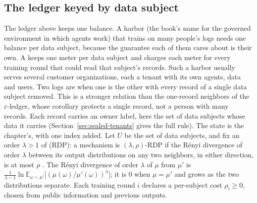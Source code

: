 \subsection{The ledger keyed by data subject}\label{sec:sealed-person-ledger}

\noindent The ledger above keeps one balance. A harbor (the book's name for
the governed environment in which agents work) that trains on many people's
logs needs one balance per data subject, because the guarantee each of them
cares about is their own. A  keeps one meter per
data subject and charges each meter for every training round that could read
that subject's records. Such a harbor usually serves several customer organizations, each a
tenant with its own agents, data and users. Two logs are
 when one is the other with every record of a
single data subject removed. This is a stronger relation than the one-record
neighbors of the $\varepsilon$-ledger, whose corollary protects a single
record, not a person with many records. Each record carries an owner label, here the set
of data subjects whose data it carries (Section~\ref{sec:sealed-tenants} gives the
full rule). The state is the chapter's, with one index added. Let $U$ be the
set of data subjects, and fix an order $\lambda>1$ of
 (RDP): a mechanism
is $(\lambda,\rho)$-RDP if the R\'enyi divergence of order $\lambda$ between its
output distributions on any two neighbors, in either direction, is at most
$\rho$ . The R\'enyi divergence of order $\lambda$ of
$\mu$ from $\mu'$ is $\frac{1}{\lambda-1}\ln\mathbb{E}_{\omega\sim \mu'}\bigl[(\mu(\omega)/\mu'(\omega))^{\lambda}\bigr]$;
it is $0$ when $\mu=\mu'$ and grows as the two distributions separate. Each training round $i$ declares a
per-subject cost $\rho_i\ge0$, chosen from public information and previous
outputs.


